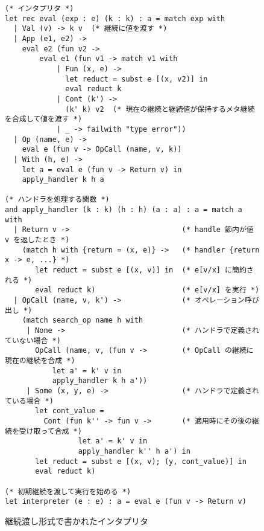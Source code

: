 \begin{figure}
\begin{verbatim}
(* インタプリタ *)
let rec eval (exp : e) (k : k) : a = match exp with
  | Val (v) -> k v  (* 継続に値を渡す *)
  | App (e1, e2) ->
    eval e2 (fun v2 ->
        eval e1 (fun v1 -> match v1 with
            | Fun (x, e) ->
              let reduct = subst e [(x, v2)] in
              eval reduct k
            | Cont (k') ->
              (k' k) v2  (* 現在の継続と継続値が保持するメタ継続を合成して値を渡す *)
            | _ -> failwith "type error"))
  | Op (name, e) ->
    eval e (fun v -> OpCall (name, v, k))
  | With (h, e) ->
    let a = eval e (fun v -> Return v) in
    apply_handler k h a

(* ハンドラを処理する関数 *)
and apply_handler (k : k) (h : h) (a : a) : a = match a with
  | Return v ->                          (* handle 節内が値 v を返したとき *)
    (match h with {return = (x, e)} ->   (* handler {return x -> e, ...} *)
       let reduct = subst e [(x, v)] in  (* e[v/x] に簡約される *)
       eval reduct k)                    (* e[v/x] を実行 *)
  | OpCall (name, v, k') ->              (* オペレーション呼び出し *)
    (match search_op name h with
     | None ->                           (* ハンドラで定義されていない場合 *)
       OpCall (name, v, (fun v ->        (* OpCall の継続に現在の継続を合成 *)
           let a' = k' v in
           apply_handler k h a'))
     | Some (x, y, e) ->                 (* ハンドラで定義されている場合 *)
       let cont_value =
         Cont (fun k'' -> fun v ->       (* 適用時にその後の継続を受け取って合成 *)
                 let a' = k' v in
                 apply_handler k'' h a') in
       let reduct = subst e [(x, v); (y, cont_value)] in
       eval reduct k)

(* 初期継続を渡して実行を始める *)
let interpreter (e : e) : a = eval e (fun v -> Return v)
\end{verbatim}
\caption{継続渡し形式で書かれたインタプリタ}
\label{figure:1cps}
\end{figure}
